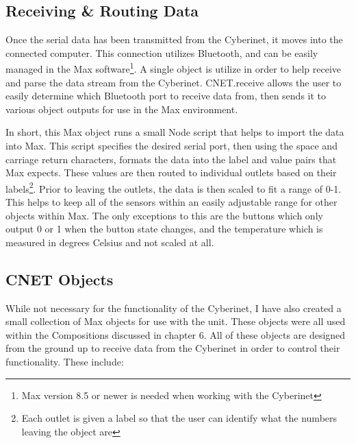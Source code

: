 \subsection{Receiving \& Routing Data}

Once the serial data has been transmitted from the Cyberinet, it moves into the connected computer. This connection utilizes Bluetooth, and can be easily managed in the Max software\footnote{Max version 8.5 or newer is needed when working with the Cyberinet}. A single object is utilize in order to help receive and parse the data stream from the Cyberinet. CNET.receive allows the user to easily determine which Bluetooth port to receive data from, then sends it to various object outputs for use in the Max environment.


In short, this Max object runs a small Node script that helps to import the data into Max. This script specifies the desired serial port, then using the space and carriage return characters, formats the data into the label and value pairs that Max expects. These values are then routed to individual outlets based on their labels\footnote{Each outlet is given a label so that the user can identify what the numbers leaving the object are}. Prior to leaving the outlets, the data is then scaled to fit a range of 0-1. This helps to keep all of the sensors within an easily adjustable range for other objects within Max. The only exceptions to this are the buttons which only output 0 or 1 when the button state changes, and the temperature which is measured in degrees Celsius and not scaled at all. 

\subsection{CNET Objects}

While not necessary for the functionality of the Cyberinet, I have also created a small collection of Max objects for use with the unit. These objects were all used within the Compositions discussed in chapter 6. All of these objects are designed from the ground up to receive data from the Cyberinet in order to control their functionality. These include:

